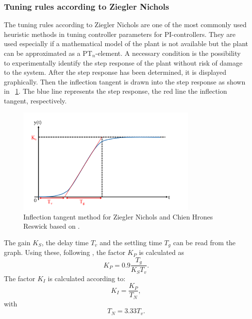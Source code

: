 \subsubsection{Tuning rules according to Ziegler Nichols}
The tuning rules according to Ziegler Nichols are one of the most commonly used heuristic methods in tuning controller parameters for PI-controllers. They are used especially if a mathematical model of the plant is not available but the plant can be approximated as a PT$_{n}$-element. \cite{Reg_17}
A necessary condition is the possibility to experimentally identify the step response of the plant without risk of damage to the system. After the step response has been determined, it is displayed graphically. Then the inflection tangent is drawn into the step response as shown in \figurename~\ref{fig:param_zn}. The blue line represents the step response, the red line the inflection tangent, respectively.
\begin{figure}
   \centering
   \includegraphics[width=0.8\textwidth]{images/param_zn.pdf}
   \caption[Inflection tangent method for Ziegler Nichols and Chien Hrones Reswick]{Inflection tangent method for Ziegler Nichols and Chien Hrones Reswick based on \cite{Reg_17}.}
   \label{fig:param_zn}
 \end{figure}
The gain $K_{S}$, the delay time $T_{v}$ and the settling time $T_{g}$ can be read from the graph.
Using these, following \cite{Reg_17}, the factor $K_{P}$ is calculated as
\begin{equation}
  K_{P} = 0.9\frac{T_{g}}{K_{S}T_{v}}.
\end{equation}
The factor $K_{I}$ is calculated according to:
\begin{equation}
    K_{I}  = \frac{K_{P}}{T_{N}},
 \label{eq:K_I}
\end{equation}
with
\begin{equation}
    T_{N}  = 3.33T_{v}.
 \label{eq:T_N}
\end{equation}
